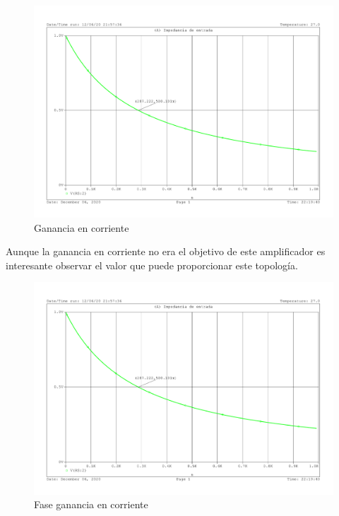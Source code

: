     \begin{figure}[H]
    \centering  
    \includegraphics[scale=0.45,page=4,trim]{images/problema_puntuable_5.pdf}
    \caption{Ganancia en corriente}
  \end{figure}
  Aunque la ganancia en corriente no era el objetivo de este
  amplificador es interesante observar el valor que puede proporcionar
  este topología.
      \begin{figure}[H]
    \centering  
    \includegraphics[scale=0.42,page=5,trim]{images/problema_puntuable_5.pdf}
    \caption{Fase ganancia en corriente}
  \end{figure}

